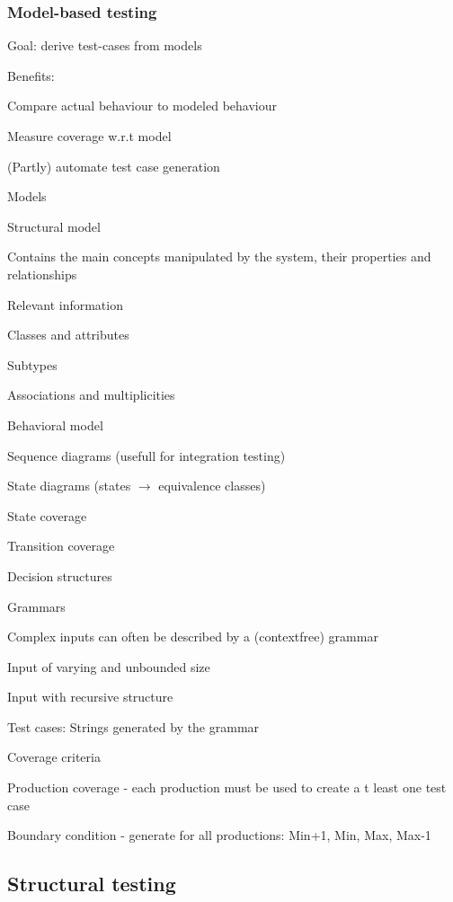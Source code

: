 \documentclass[10pt]{article}
\begin{document}
\subsubsection{Model-based testing}
\enumstart
	\item Goal: derive test-cases from models
	\item Benefits:
	\enumstart
		\item Compare actual behaviour to modeled behaviour
		\item Measure coverage w.r.t model
		\item (Partly) automate test case generation
	\enumend
	\item Models
	\enumstart
		\item Structural model
		\enumstart
			\item Contains the main concepts manipulated by the system, their properties and relationships
			\item Relevant information
			\enumstart
				\item Classes and attributes
				\item Subtypes
				\item Associations and multiplicities
			\enumend
		\enumend
		\item Behavioral model
		\enumstart
			\item Sequence diagrams (usefull for integration testing)
			\item State diagrams (states $\rightarrow$ equivalence classes)
			\enumstart
				\item State coverage
				\item Transition coverage
			\enumend
		\enumend
		\item Decision structures
		\item Grammars
		\enumstart
			\item Complex inputs can often be described by a (contextfree) grammar
			\item Input of varying and unbounded size
			\item Input with recursive structure
			\item Test cases: Strings generated by the grammar
			\item Coverage criteria
			\enumstart
				\item Production coverage - each production must be used to create a t least one test case
				\item Boundary condition - generate for all productions: Min+1, Min, Max, Max-1
			\enumend
		\enumend
	\enumend
\enumend

\subsection{Structural testing}
\end{document}
